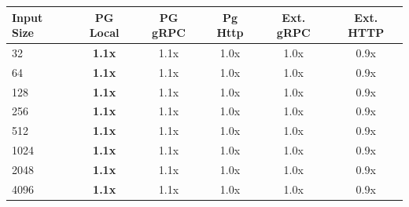 \begin{tabular}{lccccc}
\toprule
\textbf{Input Size} & \textbf{PG Local} & \textbf{PG gRPC} & \textbf{Pg Http} & \textbf{Ext. gRPC} & \textbf{Ext. HTTP} \\
\midrule
32 & \textbf{1.1x} & 1.1x & 1.0x & 1.0x & 0.9x \\
64 & \textbf{1.1x} & 1.1x & 1.0x & 1.0x & 0.9x \\
128 & \textbf{1.1x} & 1.1x & 1.0x & 1.0x & 0.9x \\
256 & \textbf{1.1x} & 1.1x & 1.0x & 1.0x & 0.9x \\
512 & \textbf{1.1x} & 1.1x & 1.0x & 1.0x & 0.9x \\
1024 & \textbf{1.1x} & 1.1x & 1.0x & 1.0x & 0.9x \\
2048 & \textbf{1.1x} & 1.1x & 1.0x & 1.0x & 0.9x \\
4096 & \textbf{1.1x} & 1.1x & 1.0x & 1.0x & 0.9x \\
\bottomrule
\end{tabular}
